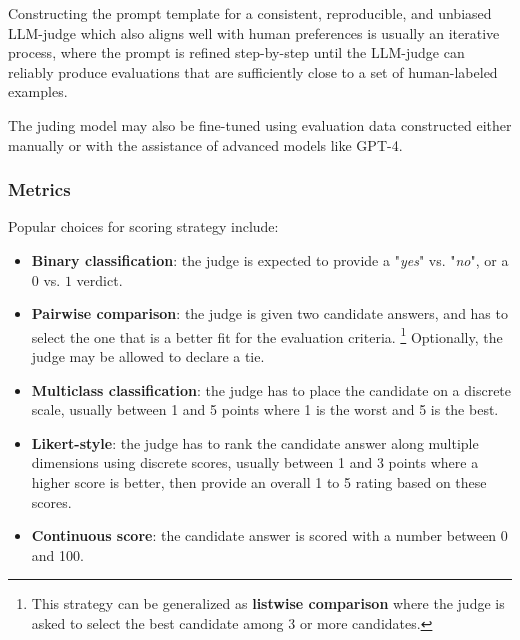 \documentclass[UTF8,noindent,nohyp,parspace,titlepage,a4paper,12pt]{article}
\begin{document}
        Constructing the prompt template for a consistent, reproducible, and
        unbiased LLM-judge which also aligns well with human preferences is
        usually an iterative process, where the prompt is refined step-by-step
        until the LLM-judge can reliably produce evaluations that are
        sufficiently close to a set of human-labeled examples.

        The juding model may also be fine-tuned using evaluation data
        constructed either manually or with the assistance of advanced models
        like GPT-4.

      \subsubsection{Metrics}

        Popular choices for scoring strategy include:

        \begin{itemize}
          \item \textbf{Binary classification}: the judge is expected to
                provide a "\emph{yes}" vs. "\emph{no}", or a $0$ vs. $1$
                verdict.

          \item \textbf{Pairwise comparison}: the judge is given two candidate
                answers, and has to select the one that is a better fit for the
                evaluation criteria. \footnote{This strategy can be generalized
                as \textbf{listwise comparison} where the judge is asked to
                select the best candidate among 3 or more candidates.}
                Optionally, the judge may be allowed to declare a tie.

          \item \textbf{Multiclass classification}: the judge has to place the
                candidate on a discrete scale, usually between 1 and 5 points
                where 1 is the worst and 5 is the best.

          \item \textbf{Likert-style}: the judge has to rank the candidate
                answer along multiple dimensions using discrete scores, usually
                between 1 and 3 points where a higher score is better, then
                provide an overall 1 to 5 rating based on these scores.

          \item \textbf{Continuous score}: the candidate answer is scored with
                a number between 0 and 100.
        \end{itemize}
\end{document}
